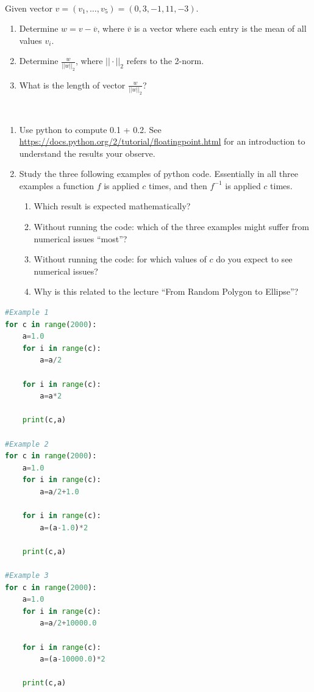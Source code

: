 \documentclass[10pt]{article}
\begin{document}
\\
 Given vector $v=(v_1, \ldots, v_5) = (0,3,-1,11,-3)$.
\begin{enumerate}
\item Determine $w=v-\overline{v}$, where $\overline{v}$ is a
  vector where each entry is the mean of all values $v_i$.
\item Determine $\frac{w}{||w||_2}$, where $||\cdot||_2$ refers to the 2-norm.
\item What is the length of vector $\frac{w}{||w||_2}$?
\end{enumerate}

\\
\begin{enumerate}
\item Use python to compute 0.1 + 0.2. See
  \url{https://docs.python.org/2/tutorial/floatingpoint.html} for an
  introduction to understand the results your observe.
\item Study the three following examples of python code. Essentially in all
three examples a function $f$ is applied $c$ times, and then $f^{-1}$
is applied $c$ times.
\begin{enumerate}
\item Which result is expected mathematically?
\item Without running the code: which of the three examples might
  suffer from numerical issues ``most''?
\item Without running the code: for which values of $c$ do you expect
  to see numerical issues? 
\item Why is this related to the lecture ``From Random
  Polygon to Ellipse''?
\end{enumerate}
\end{enumerate}
\newpage
\begin{lstlisting}[language=Python]
#Example 1
for c in range(2000):
    a=1.0
    for i in range(c):
        a=a/2
    
    for i in range(c):
        a=a*2
    
    print(c,a)

#Example 2
for c in range(2000):
    a=1.0
    for i in range(c):
        a=a/2+1.0
    
    for i in range(c):
        a=(a-1.0)*2
    
    print(c,a)

#Example 3
for c in range(2000):
    a=1.0
    for i in range(c):
        a=a/2+10000.0
    
    for i in range(c):
        a=(a-10000.0)*2
    
    print(c,a)
\end{lstlisting}
\end{document}
